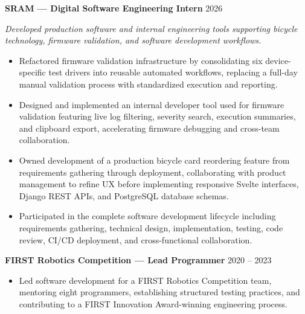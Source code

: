 \documentclass[10pt]{article}
\begin{document}
\textbf{SRAM --- Digital Software Engineering Intern}
\hfill 2026

\textit{Developed production software and internal engineering tools supporting bicycle technology, firmware validation, and software development workflows.}

\begin{itemize}

\item Refactored firmware validation infrastructure by consolidating six device-specific test drivers into reusable automated workflows, replacing a full-day manual validation process with standardized execution and reporting.

\item Designed and implemented an internal developer tool used for firmware validation featuring live log filtering, severity search, execution summaries, and clipboard export, accelerating firmware debugging and cross-team collaboration.

\item Owned development of a production bicycle card reordering feature from requirements gathering through deployment, collaborating with product management to refine UX before implementing responsive Svelte interfaces, Django REST APIs, and PostgreSQL database schemas.

\item Participated in the complete software development lifecycle including requirements gathering, technical design, implementation, testing, code review, CI/CD deployment, and cross-functional collaboration.

\end{itemize}


\vspace{2pt}

\textbf{FIRST Robotics Competition --- Lead Programmer}
\hfill 2020 -- 2023

\begin{itemize}

\item Led software development for a FIRST Robotics Competition team, mentoring eight programmers, establishing structured testing practices, and contributing to a FIRST Innovation Award-winning engineering process.

\end{itemize}

\vspace{-7pt}

\end{document}
